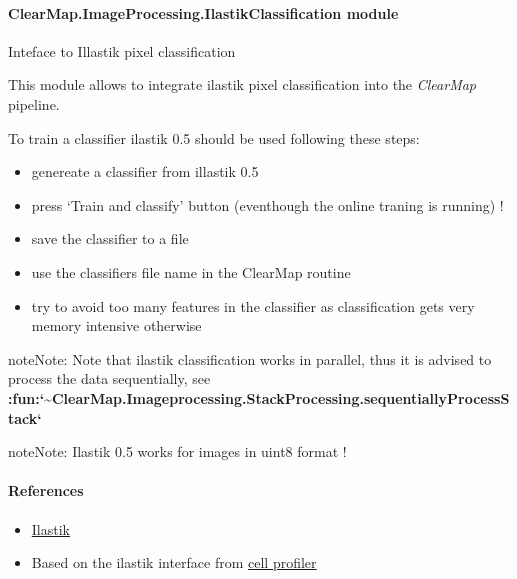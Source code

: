 \documentclass[letterpaper,10pt,english]{sphinxmanual}
\begin{document}
\paragraph{ClearMap.ImageProcessing.IlastikClassification module}
\label{api/ClearMap.ImageProcessing:module-ClearMap.ImageProcessing.IlastikClassification}\label{api/ClearMap.ImageProcessing:clearmap-imageprocessing-ilastikclassification-module}
Inteface to Illastik pixel classification

This module allows to integrate ilastik pixel classification into the \emph{ClearMap}
pipeline.

To train a classifier ilastik 0.5 should be used following these steps:
\begin{itemize}
\item {} 
genereate a classifier from illastik 0.5

\item {} 
press `Train and classify' button (eventhough the online traning is running) !

\item {} 
save the classifier to a file

\item {} 
use the classifiers file name in the ClearMap routine {\hyperref[api/ClearMap.ImageProcessing:ClearMap.ImageProcessing.IlastikClassification.classifyPixel]{\emph{}}}

\item {} 
try to avoid too many features in the classifier
as classification gets very memory intensive otherwise

\end{itemize}

\begin{notice}{note}{Note:}
Note that ilastik classification works in parallel, thus it is advised to
process the data sequentially, see
{\color{red}\bfseries{}:fun:{}`\textasciitilde{}ClearMap.Imageprocessing.StackProcessing.sequentiallyProcessStack{}`}
\end{notice}

\begin{notice}{note}{Note:}
Ilastik 0.5 works for images in uint8 format !
\end{notice}
\paragraph{References}
\begin{itemize}
\item {} 
\href{http://ilastik.org/}{Ilastik}

\item {} 
Based on the ilastik interface from \href{http://www.cellprofiler.org/}{cell profiler}

\end{itemize}
\end{document}
